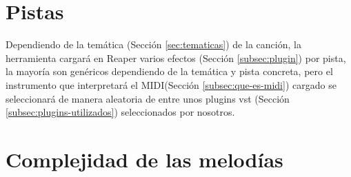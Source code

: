 \section{Pistas}\label{sec:pistas}

Dependiendo de la temática (Sección \ref{sec:tematicas}) de la canción, la herramienta cargará en Reaper varios efectos (Sección \ref{subsec:plugin}) por pista, la mayoría son genéricos dependiendo de la temática y pista concreta, pero el instrumento que interpretará el MIDI(Sección \ref{subsec:que-es-midi}) cargado se seleccionará de manera aleatoria de entre unos plugins vst (Sección \ref{subsec:plugins-utilizados}) seleccionados por nosotros.



\section{Complejidad de las melodías}

